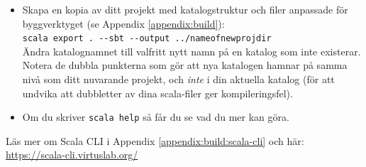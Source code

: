 \begin{itemize}
\item Skapa en kopia av ditt projekt med katalogstruktur och filer anpassade för byggverktyget  (se Appendix \ref{appendix:build}):\\
\verb|scala export . --sbt --output ../nameofnewprojdir|\\
Ändra katalognamnet  till valfritt nytt namn på en katalog som inte existerar. Notera de dubbla punkterna som gör att nya katalogen hamnar på samma nivå som ditt nuvarande projekt, och \emph{inte} i din aktuella katalog (för att undvika att dubbletter av dina scala-filer ger kompileringsfel).

\item Om du skriver \texttt{scala help} så får du se vad du mer kan göra.
\end{itemize}


\noindent
Läs mer om Scala CLI i Appendix \ref{appendix:build:scala-cli} och här: \\ \url{https://scala-cli.virtuslab.org/}






